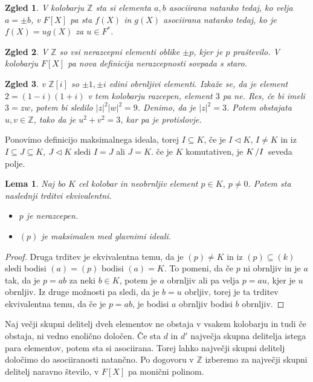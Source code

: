 \documentclass[10pt, a4paper]{article}
\newtheorem{zgled}{Zgled}[section]
\newtheorem{lema}[izr]{Lema}
\newenvironment{noticeC}{%
  \tcolorbox[%
  notitle,
  empty,
  enhanced,  %
  breakable,
  coltext=black, 
  fontupper=\rmfamily,
  parbox=false,
  noparskip,
  sharp corners,
  boxrule=-1pt,  %
  frame hidden,
  left=7pt,  %
  right=7pt,
  top=5pt,
  bottom=5pt,
  before skip=2.5ex plus 2pt,
  after skip=2.5ex plus 2pt,
  overlay unbroken and last={%
  },
  ]}
{\endtcolorbox}
\newenvironment{dokaz}%
  {\begin{noticeC}\begin{proof}}%
  {\end{proof}\end{noticeC}}
\newcommand{\Z}{\mathbb {Z}}
\newcommand{\quot}[2]{{\raisebox{0em}{$#1$}\left/\raisebox{0em}{$#2$}\right.}}
\begin{document}
\begin{zgled}
  V kolobarju $\Z$ sta si elementa $a, b$ asociirana natanko tedaj,
  ko velja $a = \pm b$, v $F[X]$ pa sta $f(X)$ in $g(X)$ asociirana natanko tedaj,
  ko je $f(X) = u g(X)$ za $u \in F^*$.
\end{zgled}

\begin{zgled}
  V $\Z$ so vsi nerazcepni elementi oblike $\pm p$, kjer je $p$ praštevilo.
  V kolobarju $F[X]$ pa nova definicija nerazcepnosti sovpada s staro.
\end{zgled}

\begin{zgled}
  v $\Z[i]$ so $\pm 1, \pm i$ edini obrnljivi elementi.
  Izkaže se, da je element $2 = (1 - i) (1 + i)$ v tem kolobarju razcepen,
  element $3$ pa ne. Res, če bi imeli $3 = zw$, potem bi sledilo $|z|^2 |w|^2 = 9$.
  Denimo, da je $|z|^2 = 3$. Potem obstajata $u, v \in \Z$, tako da je $u^2 + v^2 = 3$,
  kar pa je protislovje.
\end{zgled}

Ponovimo definicijo maksimalnega ideala, torej $I \subseteq K$, če je 
$I \lhd K$, $I \neq K$ in iz $I \subseteq J \subseteq K,\ J \lhd K$ sledi $I = J$ ali $J = K$.
če je $K$ komutativen, je $\quot{K}{I}$ seveda polje.

\begin{lema}
  Naj bo $K$ cel kolobar in neobrnljiv element $p \in K$, $p \neq 0$. Potem sta naslednji trditvi ekvivalentni.
  \begin{itemize}
    \item $p$ je nerazcepen.
    \item $(p)$ je maksimalen med glavnimi ideali.
  \end{itemize}
\end{lema}

\begin{dokaz}
  Druga trditev je ekvivalentna temu, da je $(p) \neq K$ in iz $(p) \subseteq (k)$
  sledi bodisi $(a) = (p)$ bodisi $(a) = K.$
  To pomeni, da če $p$ ni obrnljiv in je $a$ tak, da je $p = ab$ za neki $b \in K$,
  potem je $a$ obrnljiv ali pa velja $p = au$, kjer je $u$ obrnljiv. Iz druge možnosti pa sledi, da je $b = u$ obrljiv,
  torej je ta trditev ekvivalentna temu, da če je $p = ab$, je bodisi $a$ obrnljiv bodisi $b$ obrnljiv.
\end{dokaz}

Naj večji skupni delitelj dveh elementov ne obstaja v vsakem kolobarju in tudi če obstaja,
ni vedno enolično določen. Če sta $d$ in $d'$ največja skupna delitelja istega para elementov,
potem sta si asociirana. Torej lahko največji skupni delitelj določimo do asociiranosti natančno.
Po dogovoru v $\Z$ izberemo za največji skupni delitelj naravno število, v $F[X]$ pa monični polinom.
\end{document}
